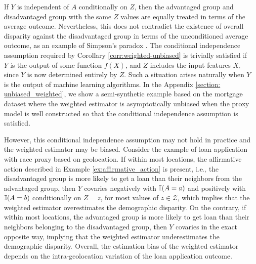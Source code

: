 If $Y$ is independent of $A$ conditionally on $Z$, then the advantaged group and disadvantaged group with the same $Z$ values are equally treated in terms of the average outcome.
Nevertheless, this does not contradict the existence of overall disparity against the disadvantaged group in terms of the unconditioned average outcome, as an example of Simpson's paradox \cite{Simpson1951}.
The conditional independence assumption required by Corollary \ref{corr:weighted-unbiased}
is trivially satisfied if $Y$ is the output of some function $f(X)$, and $Z$ includes the input features $X$, since $Y$ is now determined entirely by $Z$.
Such a situation arises naturally when $Y$ is the output of machine learning algorithms. In the Appendix \ref{section: unbiased_weighted}, we show a semi-synthetic example based on the mortgage dataset where the weighted estimator is asymptotically unbiased when the proxy model is well constructed so that the conditional independence assumption is satisfied.

However, this conditional independence assumption may not hold in practice and the weighted estimator may be biased. Consider the example of loan application with race proxy based on geolocation. If within most locations, the affirmative action described in Example \ref{ex:affirmative_action} is present, i.e., the disadvantaged group is more likely to get a loan than their neighbors from the advantaged group, then $Y$ covaries negatively with $\mathbb{I}(A = a)$ and positively with $\mathbb{I}(A = b)$ conditionally on $Z = z$, for most values of $z \in \mathcal{Z}$, which implies that the weighted estimator overestimates the demographic disparity. On the contrary, if within most locations, the advantaged group is more likely to get loan than their neighbors belonging to the disadvantaged group, then $Y$ covaries in the exact opposite way, implying that the weighted estimator underestimates the demographic disparity. Overall, the estimation bias of the weighted estimator depends on the intra-geolocation variation of the loan application outcome.




